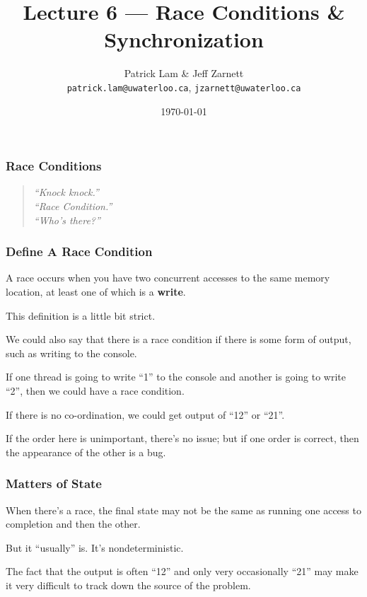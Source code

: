 
\usepackage{multirow}

\title{Lecture 6 --- Race Conditions \& Synchronization }

\author{Patrick Lam \& Jeff Zarnett \\ \small \texttt{patrick.lam@uwaterloo.ca}, \texttt{jzarnett@uwaterloo.ca}}
\date{\today}




\begin{frame}
  \titlepage

 \end{frame}



\begin{frame}
\frametitle{Race Conditions }

\vfill
\begin{quote}
\textit{
	``Knock knock.''\\
	``Race Condition.''\\
	``Who's there?''
	}
\end{quote}
\end{frame}



\begin{frame}
\frametitle{Define A Race Condition}

A race occurs when you have two concurrent accesses to the
same memory location, at least one of which is a {\bf write}.

This definition is a little bit strict. 

We could also say that there is a race condition if there is some form of output, such as writing to the console. 

If one thread is going to write ``1'' to the console and another is going to write ``2'', then we could have a race condition. 

If there is no co-ordination, we could get output of ``12'' or ``21''. 

If the order here is unimportant, there's no issue; but if one order is correct, then the appearance of the other is a bug.

\end{frame}



\begin{frame}
\frametitle{Matters of State}

When there's a race, the final state may not be the same as running
one access to completion and then the other. 

But it ``usually'' is.  It's nondeterministic. 

The fact that the output is often ``12'' and only very occasionally ``21'' may make it very difficult to track down the source of the problem. 

\end{frame}



